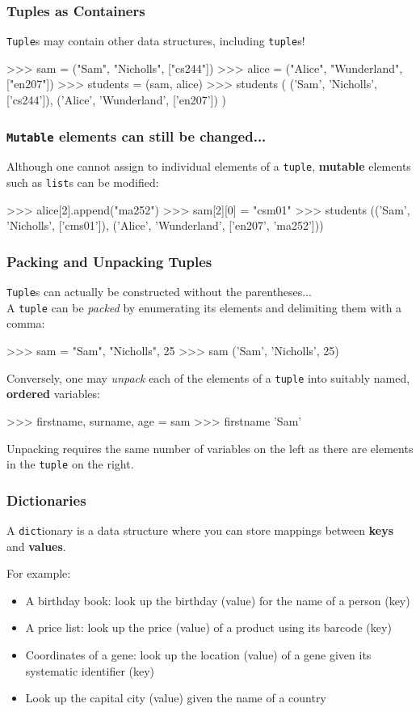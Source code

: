 \documentclass{beamer}
\begin{document}
\begin{frame}[fragile]
\frametitle{Tuples as Containers}
    \texttt{Tuple}s may contain other data structures, including \texttt{tuple}s!

\begin{code}
>>> sam = ("Sam", "Nicholls", ["cs244"])
>>> alice = ("Alice", "Wunderland", ["en207"])
>>> students = (sam, alice)
>>> students
(
    ('Sam', 'Nicholls', ['cs244']),
    ('Alice', 'Wunderland', ['en207'])
)
\end{code}
\end{frame}

\begin{frame}[fragile]
\frametitle{\texttt{Mutable} elements can still be changed...}
Although one cannot assign to individual elements of a \texttt{tuple}, \textbf{mutable}
elements such as \texttt{list}s can be modified:
\begin{code}
>>> alice[2].append("ma252")
>>> sam[2][0] = "csm01"
>>> students
(('Sam', 'Nicholls', ['cms01']),
('Alice', 'Wunderland', ['en207', 'ma252']))
\end{code}
\end{frame}


\begin{frame}[fragile]
\frametitle{Packing and Unpacking Tuples}
\texttt{Tuple}s can actually be constructed without the parentheses...\\
A \texttt{tuple} can be \textit{packed} by enumerating its elements
and delimiting them with a comma:

\begin{code}
>>> sam = "Sam", "Nicholls", 25
>>> sam
('Sam', 'Nicholls', 25)
\end{code}

\vskip 0.3cm
Conversely, one may \textit{unpack} each of the elements of a \texttt{tuple}
    into suitably named, \textbf{ordered} variables:
\begin{code}
>>> firstname, surname, age = sam
>>> firstname
'Sam'
\end{code}
Unpacking requires the same number of variables on the left as there
    are elements in the \texttt{tuple} on the right.
\end{frame}

\begin{frame}[fragile]
\frametitle{Dictionaries}
    A \texttt{dict}ionary is a data structure where you can store
    mappings between \textbf{keys} and \textbf{values}.

For example:
\begin{itemize}
\item A birthday book: look up the birthday (value) for the
name of a person (key)
\item A price list: look up the price (value) of a product
using its barcode (key)
\item Coordinates of a gene: look up the location (value)
of a gene given its systematic identifier (key)
\item Look up the capital city (value) given the name of a
country
\end{itemize}
\end{frame}
\end{document}
